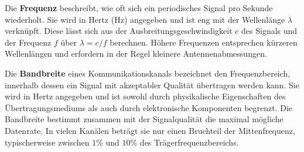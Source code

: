 Die \textbf{Frequenz} beschreibt, wie oft sich ein periodisches Signal pro Sekunde wiederholt. Sie wird in Hertz (Hz) angegeben und ist eng mit der Wellenlänge $\lambda$ verknüpft. Diese lässt sich aus der Ausbreitungsgeschwindigkeit $c$ des Signals und der Frequenz $f$ über $\lambda = c / f$ berechnen. Höhere Frequenzen entsprechen kürzeren Wellenlängen und erfordern in der Regel kleinere Antennenabmessungen.

Die \textbf{Bandbreite} eines Kommunikationskanals bezeichnet den Frequenzbereich, innerhalb dessen ein Signal mit akzeptabler Qualität übertragen werden kann. Sie wird in Hertz angegeben und ist sowohl durch physikalische Eigenschaften des Übertragungsmediums als auch durch elektronische Komponenten begrenzt. Die Bandbreite bestimmt zusammen mit der Signalqualität die maximal mögliche Datenrate. In vielen Kanälen beträgt sie nur einen Bruchteil der Mittenfrequenz, typischerweise zwischen $1\%$ und $10\%$ des Trägerfrequenzbereichs. \autocite[S. 4]{proakisDigitalCommunications2008}
